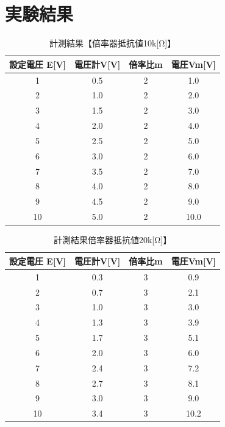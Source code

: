 \documentclass[titlepage]{jarticle}
\begin{document}
\section{実験結果}
\begin{table}[H]
    \centering
    \label{tab:tab`le1}
    \caption{計測結果【倍率器抵抗値10k[Ω]】}
    \begin{tabular}{c|c|c|c}
    設定電圧 E[V] & 電圧計V[V] & 倍率比m & 電圧Vm[V] \\
    \hline \hline
    1 & 0.5 & 2 & 1.0 \\\hline
    2 & 1.0 & 2 & 2.0 \\\hline
    3 & 1.5 & 2 & 3.0 \\\hline
    4 & 2.0 & 2 & 4.0 \\\hline
    5 & 2.5 & 2 & 5.0 \\\hline
    6 & 3.0 & 2 & 6.0 \\\hline
    7 & 3.5 & 2 & 7.0 \\\hline
    8 & 4.0 & 2 & 8.0 \\\hline
    9 & 4.5 & 2 & 9.0 \\\hline
    10 & 5.0 & 2 & 10.0 \\\hline
    \end{tabular}
\end{table}
\begin{table}[H]
    \centering
    \label{tab:tab`le2}
    \caption{計測結果倍率器抵抗値20k[Ω]】}
    \begin{tabular}{c|c|c|c}
    設定電圧 E[V] & 電圧計V[V] & 倍率比m & 電圧Vm[V] \\
    \hline \hline
    1 & 0.3 & 3 & 0.9 \\\hline
    2 & 0.7 & 3 & 2.1 \\\hline
    3 & 1.0 & 3 & 3.0 \\\hline
    4 & 1.3 & 3 & 3.9 \\\hline
    5 & 1.7 & 3 & 5.1 \\\hline
    6 & 2.0 & 3 & 6.0 \\\hline
    7 & 2.4 & 3 & 7.2 \\\hline
    8 & 2.7 & 3 & 8.1 \\\hline
    9 & 3.0 & 3 & 9.0 \\\hline
    10 & 3.4 & 3 & 10.2 \\
    \end{tabular}
\end{table}
\end{document}
